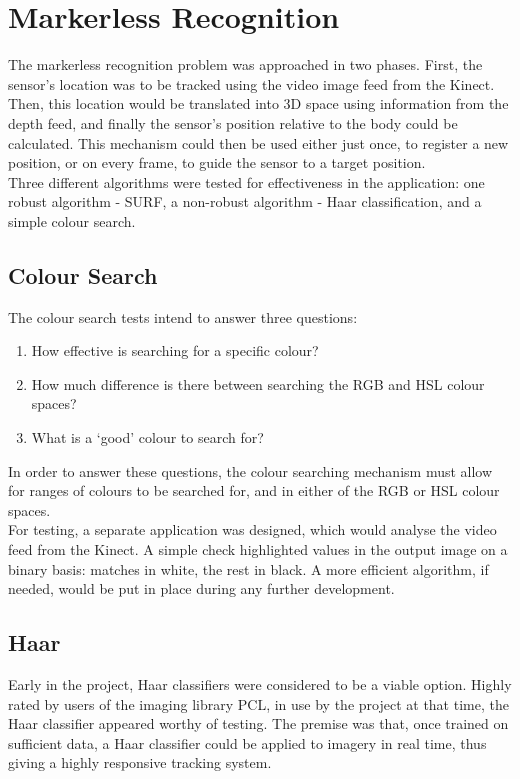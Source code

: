 \section{Markerless Recognition}
The markerless recognition problem was approached in two phases. First, the sensor's location was to be tracked using the video image feed from the Kinect. Then, this location would be translated into 3D space using information from the depth feed, and finally the sensor's position relative to the body could be calculated. This mechanism could then be used either just once, to register a new position, or on every frame, to guide the sensor to a target position.\\

Three different algorithms were tested for effectiveness in the application: one robust algorithm - SURF, a non-robust algorithm - Haar classification, and a simple colour search.\\

\subsection{Colour Search}
The colour search tests intend to answer three questions:
\begin{enumerate}
\item How effective is searching for a specific colour?
\item How much difference is there between searching the RGB and HSL colour spaces?
\item What is a ‘good’ colour to search for?
\end{enumerate}

In order to answer these questions, the colour searching mechanism must allow for ranges of colours to be searched for, and in either of the RGB or HSL colour spaces. \\

For testing, a separate application was designed, which would analyse the video feed from the Kinect. A simple check highlighted values in the output image on a binary basis: matches in white, the rest in black. A more efficient algorithm, if needed, would be put in place during any further development.\\

\subsection{Haar}
Early in the project, Haar classifiers were considered to be a viable option. Highly rated by users of the imaging library PCL, in use by the project at that time, the Haar classifier appeared worthy of testing. The premise was that, once trained on sufficient data, a Haar classifier could be applied to imagery in real time, thus giving a highly responsive tracking system.\\

